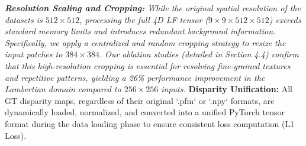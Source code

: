 \documentclass[lettersize,journal]{IEEEtran}
\begin{document}
\textit{   \textbf{Resolution Scaling and Cropping:} While the original spatial resolution of the datasets is $512 \times 512$, processing the full 4D LF tensor ($9 \times 9 \times 512 \times 512$) exceeds standard memory limits and introduces redundant background information. Specifically, we apply a centralized and random cropping strategy to resize the input patches to $384 \times 384$. Our ablation studies (detailed in Section 4.4) confirm that this high-resolution cropping is essential for resolving fine-grained textures and repetitive patterns, yielding a 26\% performance improvement in the Lambertian domain compared to $256 \times 256$ inputs.
}   \textbf{Disparity Unification:} All GT disparity maps, regardless of their original `.pfm` or `.npy` formats, are dynamically loaded, normalized, and converted into a unified PyTorch tensor format during the data loading phase to ensure consistent loss computation (L1 Loss).
\end{document}
